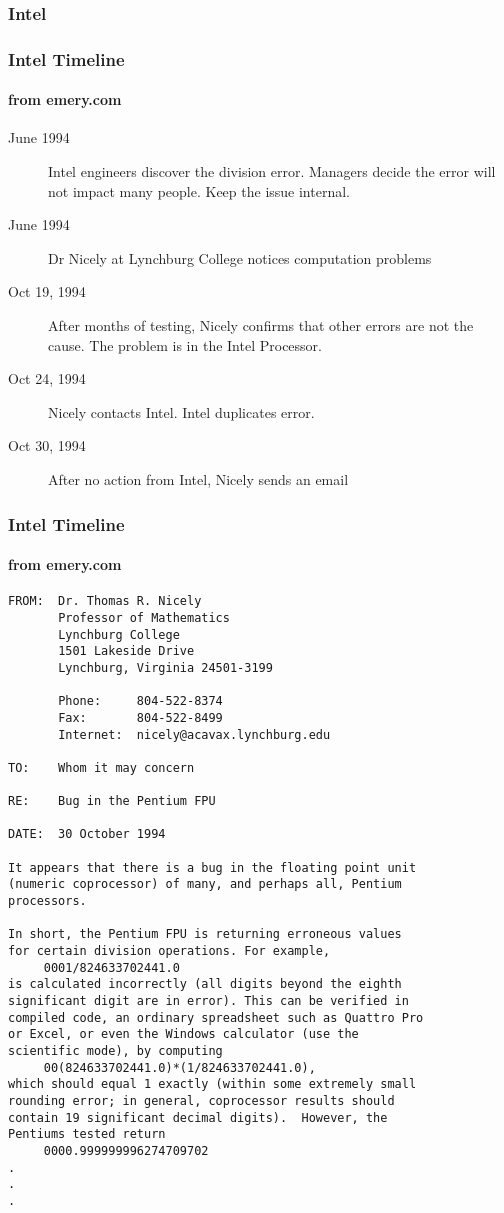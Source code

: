 \documentclass[10pt]{beamer}
\begin{document}
\begin{frame}[shrink]
\frametitle{Intel}
\end{frame}
\begin{frame}
\frametitle{Intel Timeline}
\framesubtitle{from emery.com}
\begin{description}
\item[June 1994]  Intel engineers discover the division error.  Managers
decide the error will not impact many people.  Keep the issue internal.
\item[June 1994] Dr Nicely at Lynchburg College notices computation problems
\item[Oct 19, 1994] After months of testing, Nicely confirms that other
errors are not the cause.  The problem is in the Intel Processor.
\item[Oct 24, 1994] Nicely contacts Intel.  Intel duplicates error.
\item[Oct 30, 1994] After no action from Intel, Nicely sends an email
\end{description}
\end{frame}
\begin{frame}
\frametitle{Intel Timeline}
\framesubtitle{from emery.com}
\begin{block}{}
\begin{verbatim}
FROM:  Dr. Thomas R. Nicely
       Professor of Mathematics
       Lynchburg College
       1501 Lakeside Drive
       Lynchburg, Virginia 24501-3199

       Phone:     804-522-8374
       Fax:       804-522-8499
       Internet:  nicely@acavax.lynchburg.edu

TO:    Whom it may concern

RE:    Bug in the Pentium FPU

DATE:  30 October 1994

It appears that there is a bug in the floating point unit
(numeric coprocessor) of many, and perhaps all, Pentium
processors.

In short, the Pentium FPU is returning erroneous values 
for certain division operations. For example,
     0001/824633702441.0
is calculated incorrectly (all digits beyond the eighth
significant digit are in error). This can be verified in
compiled code, an ordinary spreadsheet such as Quattro Pro
or Excel, or even the Windows calculator (use the
scientific mode), by computing
     00(824633702441.0)*(1/824633702441.0),
which should equal 1 exactly (within some extremely small
rounding error; in general, coprocessor results should 
contain 19 significant decimal digits).  However, the
Pentiums tested return
     0000.999999996274709702
.
.
.
\end{verbatim}
\end{block}
\end{frame}
\end{document}
